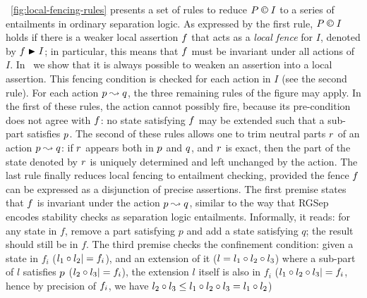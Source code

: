 \fig~\ref{fig:local-fencing-rules} presents a set of
rules to reduce $P \containI I$ to a series of entailments in
ordinary separation logic. As expressed by the first rule,
$P \containI I$ holds if there is a weaker local assertion $\lass{F}$
that acts as a \emph{local fence} for $I$, denoted by
$\lass{F}\strictfences I$; in particular, this means that $\lass{F}$
must be invariant under all actions of $I$. In~\cite{colosl-tr14}
we show that it is always possible to weaken an assertion into a local assertion. This fencing condition is
checked for each action in $I$ (see the second rule). For each action
$\lass{P}\swap \lass{Q}$, the three remaining rules of the figure may
apply. In the first of these rules, the action cannot possibly fire,
because its pre-condition does not agree with $\lass{F}$: no state
satisfying $\lass{F}$ may be extended such that a sub-part satisfies
$\lass{P}$. 
The second of these rules allows one to trim neutral parts
$\lass{R}$ of an action $\lass{P}\swap \lass{Q}$: if $\lass{R}$
appears both in $\lass{P}$ and $\lass{Q}$, and $\lass{R}$ is exact,
then the part of the state denoted by $\lass{R}$ is uniquely
determined and left unchanged by the action. 
The last rule finally reduces local fencing to entailment checking, provided the fence
$\lass{F}$ can be expressed as a disjunction of precise assertions. The
first premise states that $\lass{F}$ is invariant under the action
$\lass{P}\swap \lass{Q}$, similar to the way that RGSep encodes
stability checks as separation logic entailments. Informally, it
reads: for any state in $f$, remove a part satisfying $p$ and add a
state satisfying $q$; the result should still be in $f$. The third
premise checks the confinement condition: given a state in $f_i$ ($l_1\composeL l_2|= \lass{F}_i$), and an extension of it ($l = l_1 \circ l_2 \circ l_3$) where a sub-part of $l$ satisfies $\lass{P}$ ($l_2 \circ l_3 |= f_i$), the extension $l$ itself is also in $f_i$ ($l_1\composeL l_2\composeL
l_3|=\lass{F}_i$, hence by precision of $\lass{F}_i$, we have $l_2\circ
l_3\leq l_1\circ l_2\circ l_3 = l_1\circ l_2$)

